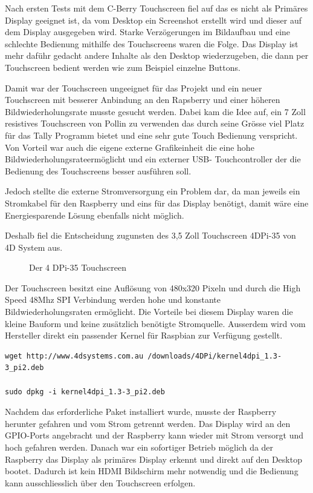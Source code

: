 \documentclass[11pt,a4paper]{article} %
\begin{document}
Nach ersten Tests mit dem C-Berry Touchscreen fiel auf das es nicht als Primäres Display geeignet ist, da vom Desktop ein Screenshot erstellt wird und dieser auf dem Display ausgegeben wird. Starke Verzögerungen im Bildaufbau und eine schlechte Bedienung mithilfe des Touchscreens waren die Folge. Das Display ist mehr daführ gedacht andere Inhalte als den Desktop wiederzugeben, die dann per Touchscreen bedient werden wie zum Beispiel einzelne Buttons.
\par
Damit war der Touchscreen ungeeignet für das Projekt und ein neuer Touchscreen mit besserer Anbindung an den Rapsberry und einer höheren Bildwiederholungsrate musste gesucht werden. Dabei kam die Idee auf, ein 7 Zoll resistives Touchscreen von Pollin \cite{6} zu verwenden das durch seine Grösse viel Platz für das Tally Programm bietet und eine sehr gute Touch Bedienung verspricht. Von Vorteil war auch die eigene externe Grafikeinheit die eine hohe Bildwiederholungsrateermöglicht  und ein externer USB- Touchcontroller der die Bedienung des Touchscreens besser ausführen soll.
\par
Jedoch stellte die externe Stromversorgung ein Problem dar, da man jeweils ein Stromkabel für den Raspberry und eins für das Display benötigt, damit wäre eine Energiesparende Lösung ebenfalls nicht möglich.
\par
Deshalb fiel die Entscheidung zugunsten des 3,5 Zoll Touchscreen 4DPi-35 von 4D System aus.\cite{7} 
\begin{figure}[h]
	\caption{Der 4 DPi-35 Touchscreen}
	\end{figure}
Der Touchscreen besitzt eine Auflösung von 480x320 Pixeln und durch die High Speed 48Mhz SPI Verbindung werden hohe und konstante Bildwiederholungsraten ermöglicht.
\newpage
Die Vorteile bei diesem Display waren die kleine Bauform und keine zusätzlich benötigte Stromquelle. Ausserdem wird vom Hersteller direkt ein passender Kernel für Raspbian zur Verfügung gestellt.
\begin{frame}

\begin{lstlisting}
wget http://www.4dsystems.com.au /downloads/4DPi/kernel4dpi_1.3-3_pi2.deb 

sudo dpkg -i kernel4dpi_1.3-3_pi2.deb
\end{lstlisting}

\end{frame}

 Nachdem das erforderliche Paket installiert wurde, musste der Raspberry herunter gefahren und vom Strom getrennt werden. Das Display wird an den GPIO-Ports angebracht und der Raspberry kann wieder mit Strom versorgt und hoch gefahren werden. Danach war ein sofortiger Betrieb möglich da der Raspberry das Display als primäres Display erkennt und direkt auf den Desktop bootet. Dadurch ist kein HDMI Bildschirm mehr notwendig und die Bedienung kann ausschliesslich über den Touchscreen erfolgen.
\par
\end{document}
